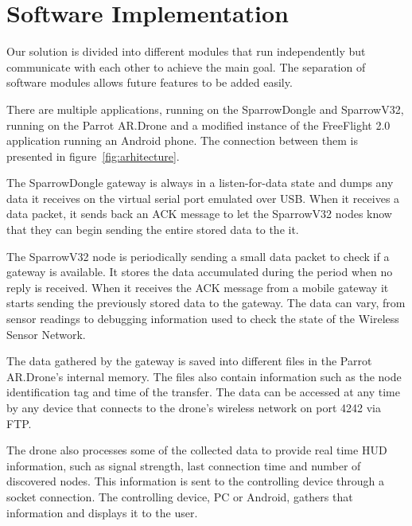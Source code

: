 \normalfont\normalsize
\chapter{Software Implementation}

Our solution is divided into different modules that run independently but communicate with each other to achieve the main goal. The separation of software modules allows future features to be added easily.

There are multiple applications, running on the SparrowDongle and SparrowV32, running on the Parrot AR.Drone and a modified instance of the FreeFlight 2.0 application running an Android phone. The connection between them is presented in figure~\ref{fig:arhitecture}.

The SparrowDongle gateway is always in a listen-for-data state and dumps any data it receives on the virtual serial port emulated over USB. When it receives a data packet, it sends back an ACK message to let the SparrowV32 nodes know that they can begin sending the entire stored data to the it.

The SparrowV32 node is periodically sending a small data packet to check if a gateway is available. It stores the data accumulated during the period when no reply is received. When it receives the ACK message from a mobile gateway it starts sending the previously stored data to the gateway. The data can vary, from sensor readings to debugging information used to check the state of the Wireless Sensor Network.

The data gathered by the gateway is saved into different files in the Parrot AR.Drone's internal memory. The files also contain information such as the node identification tag and time of the transfer. The data can be accessed at any time by any device that connects to the drone's wireless network on port 4242 via FTP.

The drone also processes some of the collected data to provide real time HUD information, such as signal strength, last connection time and number of discovered nodes. This information is sent to the controlling device through a socket connection. The controlling device, PC or Android, gathers that information and displays it to the user. 

\clearpage

